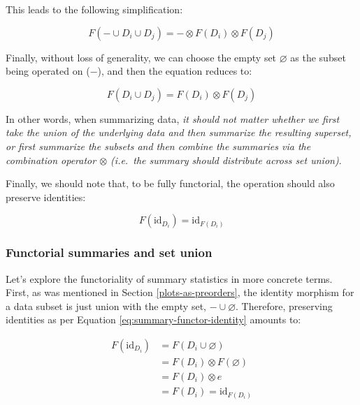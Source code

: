 \documentclass[
]{book}
\theoremstyle{definition}
\theoremstyle{definition}
\theoremstyle{definition}
\theoremstyle{definition}
\theoremstyle{remark}
\begin{document}
This leads to the following simplification:

\[F(- \cup D_i \cup D_j) = - \otimes F(D_i) \otimes F(D_j)\]

Finally, without loss of generality, we can choose the empty set \(\varnothing\) as the subset being operated on (\(-\)), and then the equation reduces to:

\begin{equation}

F(D_i \cup D_j) = F(D_i) \otimes F(D_j)
\label{eq:summary-functor-composition}

\end{equation}

In other words, when summarizing data, \emph{it should not matter whether we first take the union of the underlying data and then summarize the resulting superset, or first summarize the subsets and then combine the summaries via the combination operator \(\otimes\) (i.e.~the summary should distribute across set union)}.

Finally, we should note that, to be fully functorial, the operation should also preserve identities:

\begin{equation}

F(\text{id}_{D_i}) = \text{id}_{F(D_i)}
\label{eq:summary-functor-identity}

\end{equation}

\subsubsection{Functorial summaries and set union}\label{functorial-summaries-and-set-union}

Let's explore the functoriality of summary statistics in more concrete terms. First, as was mentioned in Section \ref{plots-as-preorders}, the identity morphism for a data subset is just union with the empty set, \(- \cup \varnothing\). Therefore, preserving identities as per Equation \eqref{eq:summary-functor-identity} amounts to:

\begin{align}

F(\text{id}_{D_i}) &= F(D_i \cup \varnothing) \\
                   &= F(D_i) \otimes F(\varnothing) \\ 
                   &= F(D_i) \otimes e \\
                   &= F(D_i) = \text{id}_{F(D_i)}
\end{align}
\end{document}
